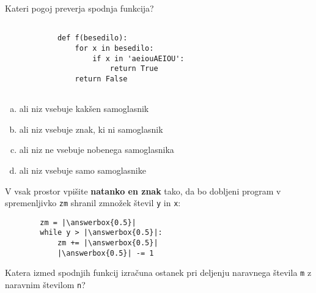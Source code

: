 \documentclass[arhiv, 10pt]{../izpit}
\newcommand{\inlinepy}[1]{\texttt{#1}}
\newcommand{\answerbox}[1]{\framebox{\vphantom{\large M}\hspace{#1cm}}}
\begin{document}
        \naloga*

        \begin{multicols}{2}
        \noindent
        Kateri pogoj preverja spodnja funkcija?
        \begin{verbatim}
        
            def f(besedilo):
                for x in besedilo:
                    if x in 'aeiouAEIOU':
                        return True
                return False
            
        \end{verbatim}

        \begin{enumerate}[(a)]
\item ali niz vsebuje kakšen samoglasnik
\item ali niz vsebuje znak, ki ni samoglasnik
\item ali niz ne vsebuje nobenega samoglasnika
\item ali niz vsebuje samo samoglasnike
\end{enumerate}

        \end{multicols}
    
        \naloga*
        \begin{multicols}{2}
        \noindent
        V vsak prostor vpišite \textbf{natanko en znak} tako, da bo dobljeni program v spremenljivko \inlinepy{zm} shranil zmnožek števil \inlinepy{y} in \inlinepy{x}:
        
        \columnbreak
        \begin{verbatim}
        zm = |\answerbox{0.5}|
        while y > |\answerbox{0.5}|:
            zm += |\answerbox{0.5}|
            |\answerbox{0.5}| -= 1
        \end{verbatim}
        \end{multicols}
    
        \clearpage
        \naloga
        
        Katera izmed spodnjih funkcij izračuna ostanek pri deljenju naravnega števila \inlinepy{m} z naravnim številom \inlinepy{n}?
    
\end{document}
